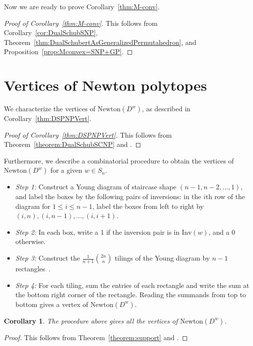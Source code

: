\documentclass[11pt]{article}
\newtheorem{coro}[theo]{Corollary}
\theoremstyle{definition}
\numberwithin{equation}{section}
\newcommand{\Inv}{\mathrm{Inv}}
\newcommand{\Newton}{\mathrm{Newton}}
\begin{document}
Now we are ready to prove Corollary~\ref{thm:M-conv}. 
\begin{proof}[Proof of Corollary~\ref{thm:M-conv}]
    This follows from Corollary~\ref{cor:DualSchubSNP}, Theorem~\ref{thm:DualSchubertAsGeneralizedPermutahedron}, and Proposition~\ref{prop:Mconvex=SNP+GP}.
\end{proof}


\section{Vertices of Newton polytopes}\label{section:vertices}

We characterize the vertices of $\Newton(D^w)$, as described in Corollary~\ref{thm:DSPNPVert}.

\begin{proof}[Proof of Corollary~\ref{thm:DSPNPVert}]
    This follows from Theorem~\ref{theorem:DualSchubSCNP} and \cite[Theorem 3.5]{2009minkowski}.
\end{proof}

Furthermore, we describe a combinatorial procedure to obtain the vertices of $\Newton(D^w)$ for a given $w \in S_n$. 

\begin{itemize}
    \item \textit{Step 1:} Construct a Young diagram of staircase shape $(n-1, n - 2, \ldots, 1)$, and label the boxes by the following pairs of inversions: in the $i$th row of the diagram for $1\le i \le n-1$, label the boxes from left to right by $(i,n), (i,n-1), \dots, (i,i+1)$.
    \item \textit{Step 2:} In each box, write a 1 if the inversion pair is in $\Inv(w)$, and a 0 otherwise.
    \item \textit{Step 3:} Construct the $\frac{1}{n+1}\binom{2n}{n}$ tilings of the Young diagram by $n-1$ rectangles~\cite{EC2add}. 
    \item \textit{Step 4:} For each tiling, sum the entries of each rectangle and write the sum at the bottom right corner of the rectangle. Reading the summands from top to bottom gives a vertex of $\Newton(D^w)$. 


\end{itemize}

\begin{coro}
    The procedure above gives all the vertices of $\Newton(D^w)$.
\end{coro}
    
\begin{proof}
    This follows from Theorem~\ref{theorem:support} and \cite[Corollary~8.2]{postnikovpermutohedra}.
\end{proof}
\end{document}
